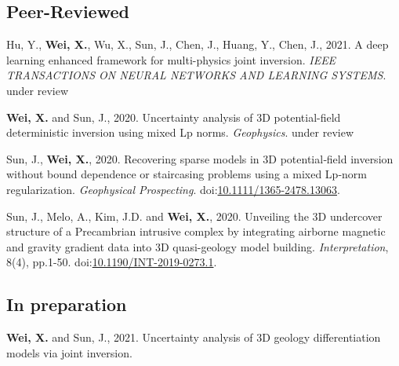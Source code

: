 \documentclass[11pt, a4paper]{article}
\newcommand{\LastName}{Wei}
\newcommand{\Initials}{X}
\newcommand{\Wei}{\textbf{\LastName, \Initials.}}  %
\newcommand{\WeiSun}{\textbf{\LastName, \Initials.} and Sun, J.}  %
\newcommand{\Review}{under review}
\newcommand{\DOI}[1]{doi:\href{https://doi.org/#1}{#1}}
\begin{document}
\subsection*{Peer-Reviewed}
\begin{etaremune}
	
	\item 
	Hu, Y., \Wei, Wu, X., Sun, J., Chen, J., Huang, Y., Chen, J., 2021. A deep learning enhanced framework for multi-physics joint inversion. \emph{IEEE TRANSACTIONS ON NEURAL NETWORKS AND LEARNING SYSTEMS}. \Review
	
	\item
	\WeiSun, 2020. Uncertainty analysis of 3D potential-ﬁeld deterministic inversion using mixed Lp norms. \emph{Geophysics}. \Review

	\item
	Sun, J., \Wei, 2020. Recovering sparse models in 3D potential‐field inversion without bound dependence or staircasing problems using a mixed Lp‐norm regularization. \emph{Geophysical Prospecting}.
	\DOI{10.1111/1365-2478.13063}.

	\item
	Sun, J., Melo, A., Kim, J.D. and \Wei, 2020. Unveiling the 3D undercover structure of a Precambrian intrusive complex by integrating airborne magnetic and gravity gradient data into 3D quasi-geology model building. \emph{Interpretation}, 8(4), pp.1-50.
	\DOI{10.1190/INT-2019-0273.1}.

\end{etaremune}

\subsection*{In preparation}
\begin{etaremune}
	
	\item
	\WeiSun, 2021. Uncertainty analysis of 3D geology differentiation models via joint inversion. 
	
\end{etaremune}
\end{document}
